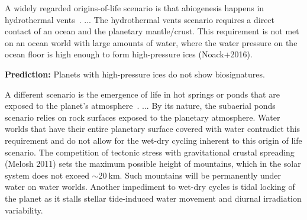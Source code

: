 \documentclass[twocolumn,twocolappendix,linenumbers]{aastex631}
\begin{document}
A widely regarded origins-of-life scenario is that abiogenesis happens in hydrothermal vents~\citep[e.g.,][]{Russel2010}.
...
The hydrothermal vents scenario requires a direct contact of an ocean and the planetary mantle/crust.
This requirement is not met on an ocean world with large amounts of water, where the water pressure on the ocean floor is high enough to form high-pressure ices (Noack+2016). %

\textbf{Prediction:} Planets with high-pressure ices do not show biosignatures.

A different scenario is the emergence of life in hot springs or ponds that are exposed to the planet's atmosphere~\citep[e.g.,][]{Deamer2019}.
...
By its nature, the subaerial ponds scenario relies on rock surfaces exposed to the planetary atmosphere.
Water worlds that have their entire planetary surface covered with water contradict this requirement and do not allow for the wet-dry cycling inherent to this origin of life scenario.
The competition of tectonic stress with gravitational crustal spreading (Melosh 2011) sets the maximum possible height of mountains, which in the solar system does not exceed $\sim \SI{20}{\kilo\meter}$.
Such mountains will be permanently under water on water worlds.
Another impediment to wet-dry cycles is tidal locking of the planet as it stalls stellar tide-induced water movement and diurnal irradiation variability.
\end{document}
